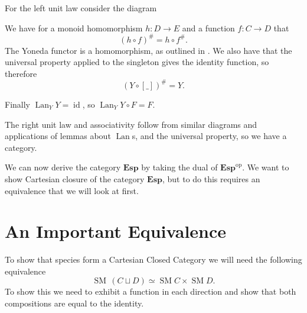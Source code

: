 \documentclass[12pt, parskip, DIV=14]{scrbook}
\renewcommand{\circ}{\vysmwhtcircle}
\newcommand{\SM}{\operatorname{SM}}
\newcommand{\Lan}{\operatorname{Lan}}
\newcommand{\Esp}{\mathbf{Esp}}
\newcommand{\op}[1]{#1^\mathrm{op}}
\newcommand{\id}{\operatorname{id}}
\begin{document}
For the left unit law consider the diagram
\begin{center}
\end{center}
We have for a monoid homomorphism $h : D \to E$ and a function $f : C \to D$ that
$$(h \circ f)^\# = h \circ f^\#.$$
The Yoneda functor is a homomorphism, as outlined in . We also have that the universal property applied to the singleton gives the identity function, so therefore
$$(Y \circ [\_])^\# = Y.$$

Finally $\Lan_Y Y = \id$, so $\Lan_Y Y \circ F = F$.

The right unit law and associativity follow from similar diagrams and applications of lemmas about $\Lan$s, and the universal property, so we have a category.



We can now derive the category $\Esp$ by taking the dual of $\op\Esp$. We want to show Cartesian closure of the category $\Esp$, but to do this requires an equivalence that we will look at first.

\section{An Important Equivalence}

To show that species form a Cartesian Closed Category we will need the following equivalence
\begin{equation}
  \label{eqn:coprodprod}
  \SM\,(C \sqcup D) \simeq \SM C \times \SM D.
\end{equation}
To show this we need to exhibit a function in each direction and show that both compositions are equal to the identity.
\end{document}
